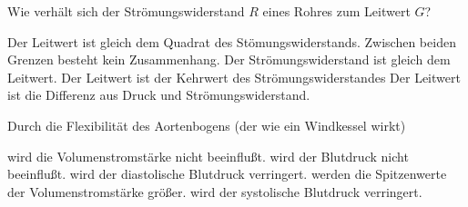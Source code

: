 \documentclass[11pt]{exam}
\begin{document}
\begin{questions}
\vspace{3mm}\question Wie verhält sich der Strömungswiderstand \(R\) eines Rohres zum Leitwert \(G\)?

\begin{choices}
	\choice Der Leitwert ist gleich dem Quadrat des Stömungswiderstands.
	\choice Zwischen beiden Grenzen besteht kein Zusammenhang.
	\choice Der Strömungswiderstand ist gleich dem Leitwert.
	\choice Der Leitwert ist der Kehrwert des Strömungswiderstandes
	\choice Der Leitwert ist die Differenz aus Druck und Strömungswiderstand.
\end{choices}

\vspace{3mm}\question Durch die Flexibilität des Aortenbogens (der wie ein Windkessel wirkt)

\begin{choices}
	\choice wird die Volumenstromstärke nicht beeinflußt.
	\choice wird der Blutdruck nicht beeinflußt.
	\choice wird der diastolische Blutdruck verringert.
	\choice werden die Spitzenwerte der Volumenstromstärke größer.
	\choice wird der systolische Blutdruck verringert.
\end{choices}

\vspace{3mm}\end{questions}
\end{document}
